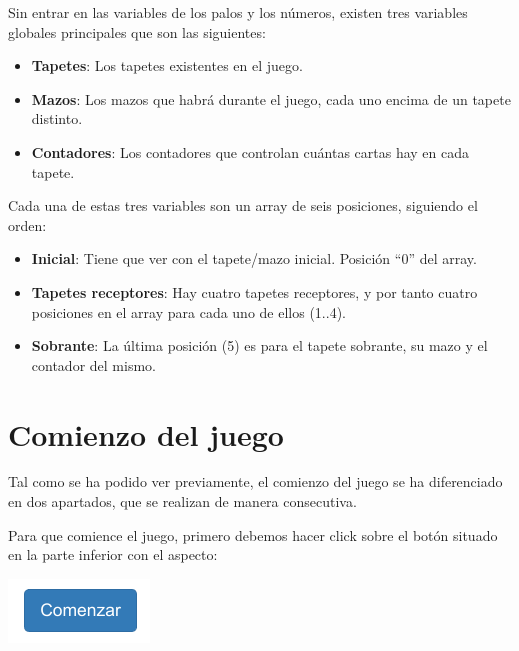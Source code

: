\documentclass{\ClassPath/viu-tfm-template}
\begin{document}
Sin entrar en las variables de los palos y los números, existen tres variables globales principales que son las siguientes:

\vspace{-1em}
\begin{itemize}
    \item \textbf{Tapetes}: Los tapetes existentes en el juego.
    \item \textbf{Mazos}: Los mazos que habrá durante el juego, cada uno encima de un tapete distinto.
    \item \textbf{Contadores}: Los contadores que controlan cuántas cartas hay en cada tapete.
\end{itemize}
\vspace{-1em}

Cada una de estas tres variables son un array de seis posiciones, siguiendo el orden:

\vspace{-1em}
\begin{itemize}
    \item \textbf{Inicial}: Tiene que ver con el tapete/mazo inicial. Posición “0” del array.
    \item \textbf{Tapetes receptores}: Hay cuatro tapetes receptores, y por tanto cuatro posiciones en el array para cada uno de ellos (1..4).
    \item \textbf{Sobrante}: La última posición (5) es para el tapete sobrante, su mazo y el contador del mismo.
\end{itemize}
\vspace{-1em}

\section{Comienzo del juego}
Tal como se ha podido ver previamente, el comienzo del juego se ha diferenciado en dos apartados, que se realizan de manera consecutiva.

Para que comience el juego, primero debemos hacer click sobre el botón situado en la parte inferior con el aspecto:

\vspace{-1.6em}
\begin{center}
    \includegraphics[width=0.2\linewidth]{img/boton.png}
\end{center}
\vspace{-1em}
\end{document}
